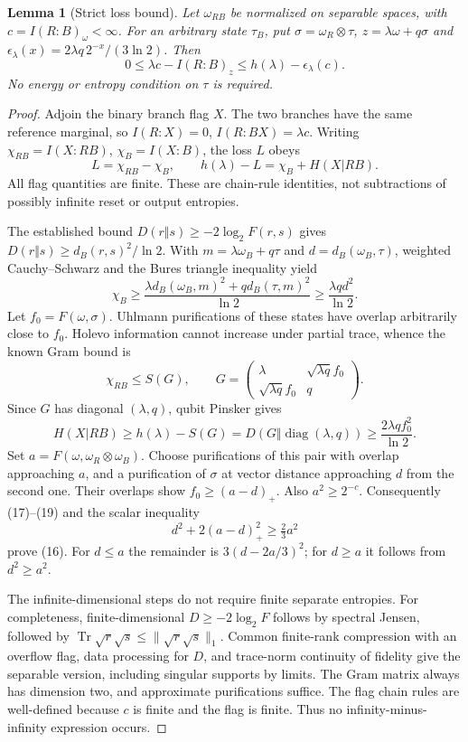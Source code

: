 \documentclass[11pt]{article}
\newtheorem{lemma}[theorem]{Lemma}
\begin{document}
\begin{lemma}[Strict loss bound]\label{lem:strict}
Let \(\omega_{RB}\) be normalized on separable spaces, with
\(c=I(R:B)_\omega<\infty\). For an arbitrary state \(\tau_B\), put
\(\sigma=\omega_R\otimes\tau\), \(z=\lambda\omega+q\sigma\) and
\(\epsilon_\lambda(x)=2\lambda q\,2^{-x}/(3\ln2)\). Then
\[
 0\le \lambda c-I(R:B)_z
 \le h(\lambda)-\epsilon_\lambda(c).                 \tag{16}
\]
No energy or entropy condition on \(\tau\) is required.
\end{lemma}
\begin{proof}
Adjoin the binary branch flag \(X\). The two branches have the same
reference marginal, so \(I(R:X)=0\), \(I(R:BX)=\lambda c\).
Writing \(\chi_{RB}=I(X:RB)\), \(\chi_B=I(X:B)\), the loss \(L\) obeys
\[
 L=\chi_{RB}-\chi_B,\qquad
 h(\lambda)-L=\chi_B+H(X|RB).                         \tag{17}
\]
All flag quantities are finite. These are chain-rule identities, not
subtractions of possibly infinite reset or output entropies.

The established bound \(D(r\Vert s)\ge-2\log_2 F(r,s)\)
\cite{renyi} gives
\(D(r\Vert s)\ge d_B(r,s)^2/\ln2\).
With \(m=\lambda\omega_B+q\tau\) and \(d=d_B(\omega_B,\tau)\),
weighted Cauchy--Schwarz and the Bures triangle inequality yield
\[
 \chi_B\ge\frac{\lambda d_B(\omega_B,m)^2+
                     q d_B(\tau,m)^2}{\ln2}
          \ge\frac{\lambda q d^2}{\ln2}.              \tag{18}
\]
Let \(f_0=F(\omega,\sigma)\). Uhlmann purifications of these states
have overlap arbitrarily close to \(f_0\). Holevo information cannot
increase under partial trace, whence the known Gram bound is
\[
 \chi_{RB}\le S(G),\qquad
 G=\begin{pmatrix}\lambda&\sqrt{\lambda q}f_0\\
                 \sqrt{\lambda q}f_0&q\end{pmatrix}.
\]
Since \(G\) has diagonal \((\lambda,q)\), qubit Pinsker gives
\[
 H(X|RB)\ge h(\lambda)-S(G)
       =D(G\Vert\operatorname{diag}(\lambda,q))
       \ge\frac{2\lambda q f_0^2}{\ln2}.              \tag{19}
\]
Set \(a=F(\omega,\omega_R\otimes\omega_B)\).
Choose purifications of this pair with overlap approaching \(a\),
and a purification of \(\sigma\) at vector distance approaching \(d\)
from the second one. Their overlaps show
\(f_0\ge(a-d)_+\). Also \(a^2\ge2^{-c}\).
Consequently (17)--(19) and the scalar inequality
\[
 d^2+2(a-d)_+^2\ge\tfrac23a^2
\]
prove (16). For \(d\le a\) the remainder is
\(3(d-2a/3)^2\); for \(d\ge a\) it follows from \(d^2\ge a^2\).

The infinite-dimensional steps do not require finite separate entropies.
For completeness, finite-dimensional \(D\ge-2\log_2 F\) follows by
spectral Jensen, followed by
\(\operatorname{Tr}\sqrt r\sqrt s\le\|\sqrt r\sqrt s\|_1\).
Common finite-rank compression with an overflow flag, data processing
for \(D\), and trace-norm continuity of fidelity give the separable
version, including singular supports by limits. The Gram matrix
always has dimension two, and approximate purifications suffice.
The flag chain rules are well-defined because \(c\) is finite and
the flag is finite. Thus no infinity-minus-infinity expression occurs.
\end{proof}
\end{document}

